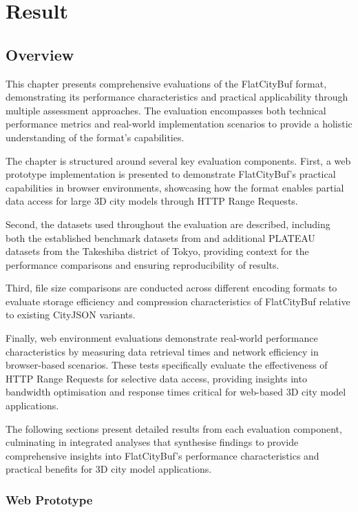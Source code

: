 \chapter{Result}
\label{chp:result}
\section{Overview}
\label{result:overview}
This chapter presents comprehensive evaluations of the FlatCityBuf format, demonstrating its performance characteristics and practical applicability through multiple assessment approaches. The evaluation encompasses both technical performance metrics and real-world implementation scenarios to provide a holistic understanding of the format's capabilities.

The chapter is structured around several key evaluation components. First, a web prototype implementation is presented to demonstrate FlatCityBuf's practical capabilities in browser environments, showcasing how the format enables partial data access for large 3D city models through HTTP Range Requests.

Second, the datasets used throughout the evaluation are described, including both the established benchmark datasets from \citet{ledoux_2024} and additional PLATEAU datasets from the Takeshiba district of Tokyo, providing context for the performance comparisons and ensuring reproducibility of results.

Third, file size comparisons are conducted across different encoding formats to evaluate storage efficiency and compression characteristics of FlatCityBuf relative to existing CityJSON variants.

Finally, web environment evaluations demonstrate real-world performance characteristics by measuring data retrieval times and network efficiency in browser-based scenarios. These tests specifically evaluate the effectiveness of HTTP Range Requests for selective data access, providing insights into bandwidth optimisation and response times critical for web-based 3D city model applications.

The following sections present detailed results from each evaluation component, culminating in integrated analyses that synthesise findings to provide comprehensive insights into FlatCityBuf's performance characteristics and practical benefits for 3D city model applications.

\subsection{Web Prototype}
\label{result:web_prototype}

